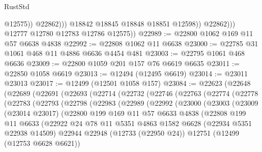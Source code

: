 \begin{lexlean}{RustStd}
\begin{coremodule}
                            @12575))
                        @22862)))
                  @18842
                  @18845
                  @18848
                  @18851
                  @12598))
              @22862)))
        @12777
        @12780
        @12783
        @12786
        @12575))
@22989 := @22800 @1062 @169 @11 @57 @6638 @4838
@22992 := @22808 @1062 @11 @6638
@23000 := @22785 @31 @1061 @468 @11 @4886 @6636 @4454 @481
@23003 := @22795 @1061 @468 @6636
@23009 := @22800 @1059 @201 @157 @76 @6619 @6635
@23011 := @22850 @1058 @6619
@23013 := @12494 (@12495 @6619)
@23014 := @23011 @23013
@23017 := @12499 (@12501 @1058 @157)
@23084 := @22623
    (@22648
      (@22689
        (@22691
          (@22693
            (@22714
              (@22732
                (@22746
                  (@22763
                    (@22774
                      (@22778
                        (@22783
                          (@22793
                            (@22798
                              (@22983
                                (@22989
                                  (@22992
                                    (@23000
                                      (@23003
                                        (@23009
                                          (@23014 @23017)
                                          (@22800
                                            @199
                                            @169
                                            @11
                                            @57
                                            @6633
                                            @4838
                                            (@22808
                                              @199
                                              @11
                                              @6633
                                              (@22922
                                                @24
                                                @78
                                                @11
                                                @5351
                                                @4863
                                                @1582
                                                @6628
                                                (@22934 @5351 @22938 @14509)
                                                @22944
                                                @22948
                                                (@12733 (@22950 @24))
                                                @12751
                                                (@12499 (@12753 @6628 @6621))

\end{coremodule}
\end{lexlean}
